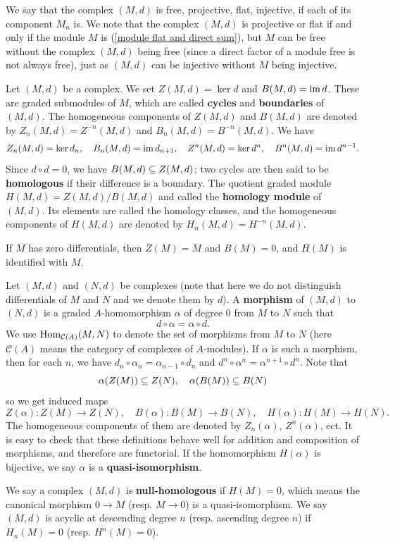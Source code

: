 We say that the complex $(M,d)$ is free, projective, flat, injective, if each of its component $M_n$ is. We note that the complex $(M,d)$ is projective or flat if and only if the module $M$ is (\cref{module flat and direct sum}), but $M$ can be free without the complex $(M,d)$ being free (since a direct factor of a module free is not always free), just as $(M,d)$ can be injective without $M$ being injective.\par
Let $(M,d)$ be a complex. We set $Z(M,d)=\ker d$ and $B(M,d)=\operatorname{im} d$. These are graded submodules of $M$, which are called \textbf{cycles} and \textbf{boundaries} of $(M,d)$. The homogeneous components of $Z(M,d)$ and $B(M,d)$ are denoted by $Z_n(M,d)=Z^{-n}(M,d)$ and $B_n(M,d)=B^{-n}(M,d)$. We have
\[Z_n(M,d)=\operatorname{ker} d_n,\quad B_n(M,d)=\operatorname{im} d_{n+1},\quad Z^n(M,d)=\operatorname{ker} d^n,\quad B^n(M,d)=\operatorname{im} d^{n-1}.\]
Since $d\circ d=0$, we have $B(M,d)\subseteq Z(M,d)$; two cycles are then said to be \textbf{homologous} if their difference is a boundary. The quotient graded module $H(M,d)=Z(M,d)/B(M,d)$ and called the \textbf{homology module} of $(M,d)$. Its elements are called the homology classes, and the homogeneous components of $H(M,d)$ are denoted by $H_n(M,d)=H^{-n}(M,d)$.
\begin{example}
If $M$ has zero differentials, then $Z(M)=M$ and $B(M)=0$, and $H(M)$ is identified with $M$.
\end{example}
Let $(M,d)$ and $(N,d)$ be complexes (note that here we do not distinguish differentials of $M$ and $N$ and we denote them by $d$). A \textbf{morphism} of $(M,d)$ to $(N,d)$ is a graded $A$-homomorphism $\alpha$ of degree $0$ from $M$ to $N$ such that
\[d\circ\alpha=\alpha\circ d.\]
We use $\mathrm{Hom}_{\mathcal{C}(A)}(M,N)$ to denote the set of morphisms from $M$ to $N$ (here $\mathcal{C}(A)$ means the category of complexes of $A$-modules). If $\alpha$ is such a morphism, then for each $n$, we have $d_n\circ\alpha_n=\alpha_{n-1}\circ d_n$ and $d^n\circ\alpha^n=\alpha^{n+1}\circ d^n$. Note that
\[\alpha(Z(M))\subseteq Z(N),\quad \alpha(B(M))\subseteq B(N)\]
so we get induced maps
\[Z(\alpha):Z(M)\to Z(N),\quad B(\alpha):B(M)\to B(N),\quad H(\alpha):H(M)\to H(N).\]
The homogeneous components of them are denoted by $Z_n(\alpha)$, $Z^n(\alpha)$, ect. It is easy to check that these definitions behave well for addition and composition of morphisms, and therefore are functorial. If the homomorphism $H(\alpha)$ is bijective, we say $\alpha$ is a \textbf{quasi-isomorphism}.\par
We say a complex $(M,d)$ is \textbf{null-homologous} if $H(M)=0$, which means the canonical morphism $0\to M$ (resp. $M\to 0$) is a quasi-isomorphism. We say $(M,d)$ is acyclic at descending degree $n$ (resp. ascending degree $n$) if $H_n(M)=0$ (resp. $H^n(M)=0$).\par
